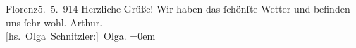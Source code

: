 \begin{ledgroupsized}[t]{13cm}
           \pstart
           \centering{}{\pb}Florenz5. 5. 914\pend
           \pstart
           Herzliche Grüße!\pend
           \pstart
           Wir haben das ſchönſte Wetter und befinden uns ſehr wohl.\pend
           \pstart
           \spacefill\mbox{Arthur.}{\\[\baselineskip]}\spacefill\mbox{{[}hs. Olga Schnitzler:{]} Olga.}\pend
           \leftskip=0em{}
         
         \endnumbering{}\end{ledgroupsized}  \newcommand{\dateiname}{L02177}\newcommand{\titel}{Arthur und Olga Schnitzler an Richard und Paula Beer-Hofmann, 5. 5. 1914}\newcommand{\editorInnen}{Martin Anton Müller und Gerd-Hermann Susen}
      